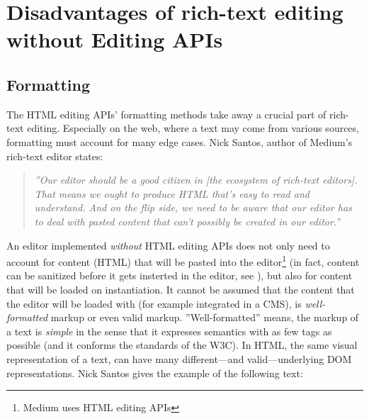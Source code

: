 
\section{Disadvantages of rich-text editing without Editing APIs}

\subsection{Formatting}
\label{subsec:noapi_dis_formatting}
The HTML editing APIs' formatting methods take away a crucial part of rich-text editing. Especially on the web, where a text may come from various sources, formatting must account for many edge cases. Nick Santos, author of Medium's rich-text editor states:

\begin{quotation}
\textit{''Our editor should be a good citizen in [the ecosystem of rich-text editors]. That means we ought to produce HTML that's easy to read and understand. And on the flip side, we need to be aware that our editor has to deal with pasted content that can't possibly be created in our editor.\cite{so_paste_plain}''}
\end{quotation}


An editor implemented \textit{without} HTML editing APIs does not only need to account for content (HTML) that will be pasted into the editor\footnote{Medium uses HTML editing APIs} (in fact, content can be sanitized before it gets insterted in the editor, see ), but also for content that will be loaded on instantiation. It cannot be assumed that the content that the editor will be loaded with (for example integrated in a CMS), is \textit{well-formatted} markup or even valid markup. ''Well-formatted'' means, the markup of a text is \textit{simple} in the sense that it expresses semantics with as few tags as possible (and it conforms the standards  of the W3C). In HTML, the same visual representation of a text, can have many different---and valid---underlying DOM representations. Nick Santos gives the example of the following text\cite{so_paste_plain}:



